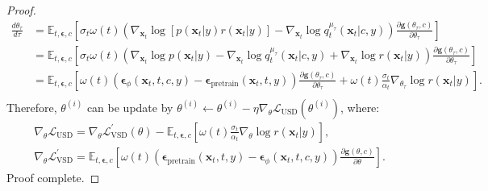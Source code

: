 \begin{proof}
\begin{equation}
    \begin{aligned}
        \frac{d\theta_\tau}{d\tau}
        &= \mathbb{E}_{t,\boldsymbol{\epsilon},c}\left[
            \sigma_t\omega(t)\left(\nabla_{\boldsymbol{x}_t}\log \left[ p(\boldsymbol{x}_t|y) r(\boldsymbol{x}_t|y) \right]-\nabla_{\boldsymbol{x}_t}\log q_t^{\mu_\tau}(\boldsymbol{x}_t|c,y)\right)\frac{\partial\boldsymbol{g}(\theta_\tau,c)}{\partial\theta_\tau}\right] \\
        &= \mathbb{E}_{t,\boldsymbol{\epsilon},c}\left[
            \sigma_t\omega(t)\left(\nabla_{\boldsymbol{x}_t}\log p(\boldsymbol{x}_t|y) -\nabla_{\boldsymbol{x}_t}\log q_t^{\mu_\tau}(\boldsymbol{x}_t|c,y) + \nabla_{\boldsymbol{x}_t}\log r(\boldsymbol{x}_t|y) \right)\frac{\partial\boldsymbol{g}(\theta_\tau,c)}{\partial\theta_\tau}\right] \\
        &= \mathbb{E}_{t,\boldsymbol{\epsilon},c}\left[
            \omega(t)\left(\boldsymbol{\epsilon}_\phi(\boldsymbol{x}_t,t,c,y)-\boldsymbol{\epsilon}_\text{pretrain}(\boldsymbol{x}_t,t,y)\right)\frac{\partial\boldsymbol{g}(\theta_\tau,c)}{\partial\theta_\tau} + \omega(t)\frac{\sigma_t}{\alpha_t}\nabla_{\theta_\tau}\log r(\boldsymbol{x}_t|y)\right]. \\
    \end{aligned}
\end{equation}
Therefore, $\theta^{(i)}$ can be update by $\theta^{(i)}\leftarrow\theta^{(i)}-\eta\nabla_\theta\mathcal{L}_\text{USD}(\theta^{(i)})$, where:
\begin{equation}
    \begin{gathered}
        \nabla_\theta\mathcal{L}_\text{USD} = \nabla_\theta \mathcal{L}_\text{VSD}^\prime(\theta) - \mathbb{E}_{t,\boldsymbol{\epsilon},c}\left[\omega(t)\frac{\sigma_t}{\alpha_t}\nabla_{\theta}\log r(\boldsymbol{x}_t|y)\right], \\
        \nabla_\theta\mathcal{L}_\text{VSD}^\prime = \mathbb{E}_{t,\boldsymbol{\epsilon},c}\left[\omega(t)\left(\boldsymbol{\epsilon}_\text{pretrain}(\boldsymbol{x}_t,t,y)-\boldsymbol{\epsilon}_\phi(\boldsymbol{x}_t,t,c,y)\right)\frac{\partial\boldsymbol{g}(\theta,c)}{\partial\theta}\right].
    \end{gathered}
\end{equation}
Proof complete.

\end{proof}











